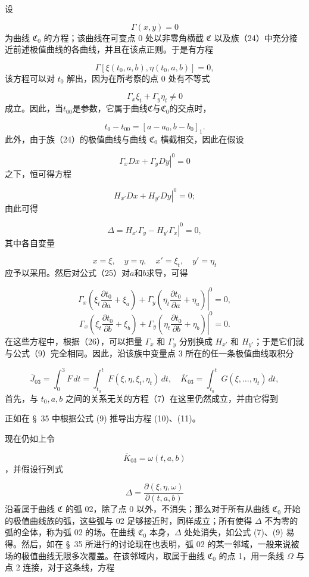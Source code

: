 \documentclass[11pt,a4paper,leqno]{article}
\begin{document}
设

\[
\Gamma(x,y)=0
\]
为曲线 $\mathfrak{C}_0$ 的方程；该曲线在可变点 0 处以非零角横截 $\mathfrak{C}$ 以及族（24）中充分接近前述极值曲线的各曲线，并且在该点正则。于是有方程

\begin{equation}\tag{25}
\Gamma[\xi(t_0,a,b),\eta(t_0,a,b)]=0,
\end{equation}
该方程可以对 $t_0$ 解出，因为在所考察的点 0 处有不等式

\[
\Gamma_x\xi_t+\Gamma_y\eta_t\neq0
\]
成立。因此，当$t_{00}$是参数，它属于曲线$\mathfrak{C}$与$\mathfrak{C}_0$的交点时，

\[
t_0-t_{00}=[a-a_0,b-b_0]_1.
\]
此外，由于族（24）的极值曲线与曲线 $\mathfrak{C}_0$ 横截相交，因此在假设

\[
\left.\Gamma_xDx+\Gamma_yDy\right|^0=0
\]
之下，恒可得方程

\[
\left.H_{x'}Dx+H_{y'}Dy\right|^0=0;
\]
由此可得

\begin{equation}\tag{26}
\left.\Delta=H_{x'}\Gamma_y-H_{y'}\Gamma_x\right|^0=0,
\end{equation}
其中各自变量

\begin{equation}\tag{27}
x=\xi,\quad y=\eta,\quad x'=\xi_t,\quad y'=\eta_t
\end{equation}
应予以采用。然后对公式（25）对$a$和$b$求导，可得

\[
\left.\Gamma_x\left(\xi_t\frac{\partial t_0}{\partial a}+\xi_a\right)+\Gamma_y\left(\eta_t\frac{\partial t_0}{\partial a}+\eta_a\right)\right|^0=0,
\]
\[
\left.\Gamma_x\left(\xi_t\frac{\partial t_0}{\partial b}+\xi_b\right)+\Gamma_y\left(\eta_t\frac{\partial t_0}{\partial b}+\eta_b\right)\right|^0=0.
\]
在这些方程中，根据（26），可以把量 $\Gamma_x$ 和 $\Gamma_y$ 分别换成 $H_{x'}$ 和 $H_{y'}$；于是它们就与公式（9）完全相同。因此，沿该族中变量点 3 所在的任一条极值曲线取积分

\[
\overline{J}_{03}=\int_0^3 F\,dt=\int_{t_0}^{t}F(\xi,\eta,\xi_t,\eta_t)\,dt,\quad
\overline{K}_{03}=\int_{t_0}^{t}G(\xi,\ldots,\eta_t)\,dt,
\]
首先，与 $t_0,a,b$ 之间的关系无关的方程（7）在这里仍然成立，并由它得到

正如在 \S~35 中根据公式 (9) 推导出方程 (10)、(11)。

现在仍如上令

\[
\overline{K}_{03}=\omega(t,a,b)
\]
，并假设行列式

\[
\Delta=\frac{\partial(\xi,\eta,\omega)}{\partial(t,a,b)}
\]
沿着属于曲线 $\mathfrak{C}$ 的弧 02，除了点 0 以外，不消失；那么对于所有从曲线 $\mathfrak{C}_0$ 开始的极值曲线族的弧，这些弧与 02 足够接近时，同样成立；所有使得 $\Delta$ 不为零的弧的全体，称为弧 02 的场。在曲线 $\mathfrak{C}_0$ 本身，$\Delta$ 处处消失，如公式 (7)、(9) 易得。然后，如在 \S~35 所进行的讨论现在也表明，弧 02 的某一邻域，一般来说被场的极值曲线无限多次覆盖。在该邻域内，取属于曲线 $\mathfrak{C}_0$ 的点 1，用一条线 $\Omega$ 与点 2 连接，对于这条线，方程
\end{document}

